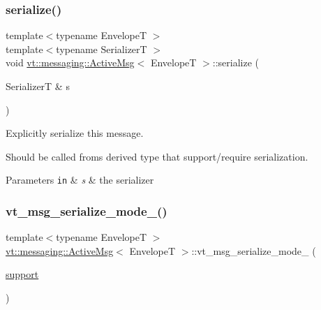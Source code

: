 \mbox{\label{structvt_1_1messaging_1_1_active_msg_a758f02bef5991c48d6c9a56c30ca7ad9}} 
\subsubsection{\texorpdfstring{serialize()}{serialize()}}
{\footnotesize\ttfamily template$<$typename EnvelopeT $>$ \\
template$<$typename SerializerT $>$ \\
void \hyperlink{structvt_1_1messaging_1_1_active_msg}{vt\+::messaging\+::\+Active\+Msg}$<$ EnvelopeT $>$\+::serialize (\begin{DoxyParamCaption}\item[{SerializerT \&}]{s }\end{DoxyParamCaption})\hspace{0.3cm}{\ttfamily [inline]}}



Explicitly serialize this message. 

Should be called froms derived type that support/require serialization.


\begin{DoxyParams}[1]{Parameters}
\mbox{\tt in}  & {\em s} & the serializer \\
\hline
\end{DoxyParams}
\mbox{\label{structvt_1_1messaging_1_1_active_msg_a97b214f27e477ea5951a2d697f2256e7}} 
\subsubsection{\texorpdfstring{vt\+\_\+msg\+\_\+serialize\+\_\+mode\+\_\+()}{vt\_msg\_serialize\_mode\_()}}
{\footnotesize\ttfamily template$<$typename EnvelopeT $>$ \\
\hyperlink{structvt_1_1messaging_1_1_active_msg}{vt\+::messaging\+::\+Active\+Msg}$<$ EnvelopeT $>$\+::vt\+\_\+msg\+\_\+serialize\+\_\+mode\+\_\+ (\begin{DoxyParamCaption}\item[{\hyperlink{namespacevt_1_1messaging_a436c5b9fc7f591e5978a136999cb9ef8a434990c8a25d2be94863561ae98bd682}{support}}]{ }\end{DoxyParamCaption})}



